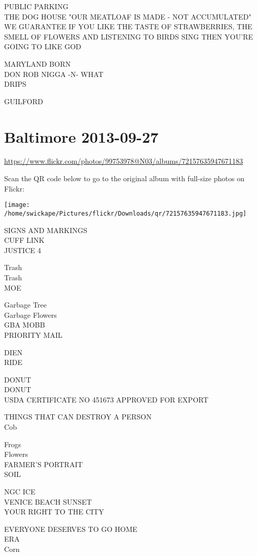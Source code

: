 \documentclass[10pt,letterpaper]{article}
\begin{document}
PUBLIC PARKING\\
THE DOG HOUSE "OUR MEATLOAF IS MADE {-} NOT ACCUMULATED"\\
WE GUARANTEE IF YOU LIKE THE TASTE OF STRAWBERRIES, THE SMELL OF FLOWERS AND LISTENING TO BIRDS SING THEN YOU'RE GOING TO LIKE GOD

MARYLAND BORN\\
DON ROB NIGGA {-}N{-} WHAT\\
DRIPS

GUILFORD
\pagebreak

\section*{Baltimore 2013-09-27}

\url{https://www.flickr.com/photos/99753978@N03/albums/72157635947671183}

Scan the QR code below to go to the original album with full-size photos on Flickr:

\texttt{[image: /home/swickape/Pictures/flickr/Downloads/qr/72157635947671183.jpg]}
\pagebreak

SIGNS AND MARKINGS\\
CUFF LINK\\
JUSTICE 4

Trash\\
Trash\\
MOE

Garbage Tree\\
Garbage Flowers\\
GBA MOBB\\
PRIORITY MAIL

DIEN\\
RIDE

DONUT\\
DONUT\\
USDA CERTIFICATE NO 451673 APPROVED FOR EXPORT

THINGS THAT CAN DESTROY A PERSON\\
Cob

Frogs\\
Flowers\\
FARMER'S PORTRAIT\\
SOIL

NGC ICE\\
VENICE BEACH SUNSET\\
YOUR RIGHT TO THE CITY

EVERYONE DESERVES TO GO HOME\\
ERA\\
Corn
\end{document}
